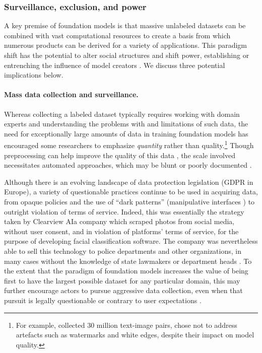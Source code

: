 \subsubsection{Surveillance, exclusion, and power}
\label{sec:ethics-surveillance}

A key premise of foundation models is that massive unlabeled datasets can be combined with vast computational resources to create a basis from which numerous products can be derived for a variety of applications. This paradigm shift has the potential to alter social structures and shift power, establishing or entrenching the influence of model creators \citep{zimmerman_2020}. 
We discuss three potential implications below.

\paragraph{Mass data collection and surveillance.} 

Whereas collecting a labeled dataset typically requires working with domain experts and understanding the problems with and limitations of such data, the need for exceptionally large amounts of data in training foundation models has encouraged some researchers to emphasize \emph{quantity} rather than quality.\footnote{For example, \citet{ding.2021} collected 30 million text-image pairs, chose not to address artefacts such as watermarks and white edges, despite their impact on model quality.} 
Though preprocessing can help improve the quality of this data \citep[\eg][]{brown2020gpt3}, the scale involved necessitates automated approaches, which may be blunt or poorly documented \citep{dodge.2021.documenting}.

Although there is an evolving landscape of data protection legislation (\eg GDPR in Europe), a variety of questionable practices continue to be used in acquiring data, from opaque policies \citep{obar.2020} and the use of ``dark patterns'' (\ie manipulative interfaces \citep{narayanan.2020}) to outright violation of terms of service. 
Indeed, this was essentially the strategy taken by Clearview AI\dash{}a company which scraped photos from social media, without user consent, and in violation of platforms' terms of service, for the purpose of developing facial classification software. 
The company was nevertheless able to sell this technology to police departments and other organizations, in many cases without the knowledge of state lawmakers or department heads \citep{mac.2021}. 
To the extent that the paradigm of foundation models increases the value of being first to have the largest possible dataset for any particular domain, this may further encourage actors to pursue aggressive data collection, even when that pursuit is legally questionable or contrary to user expectations \citep{nissenbaum.2009, zuboff.2018}.

